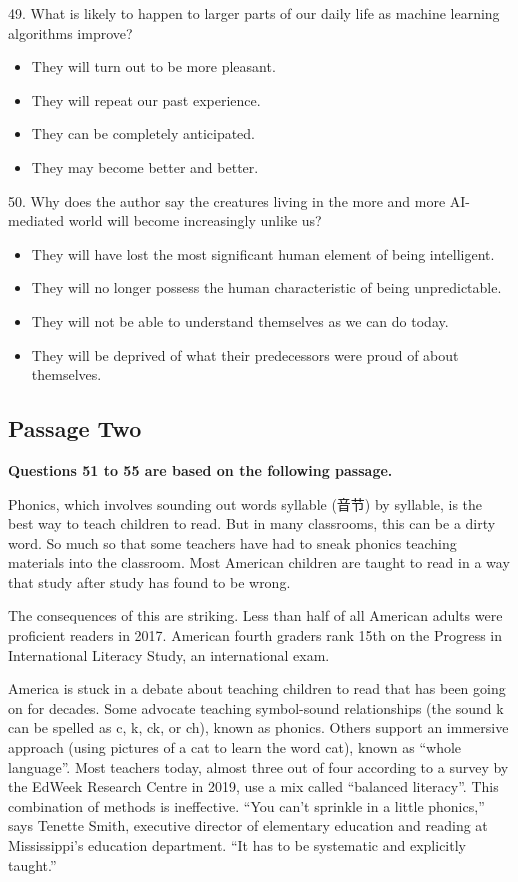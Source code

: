 \documentclass[UTF8,11pt]{ctexart}
\begin{document}
49. What is likely to happen to larger parts of our daily life as machine learning algorithms improve?


\begin{itemize}[leftmargin=2em,itemsep=.2em,topsep=.4em]\item[A.] They will turn out to be more pleasant.
\item[B.] They will repeat our past experience.
\item[C.] They can be completely anticipated.
\item[D.] They may become better and better.
\end{itemize}

50. Why does the author say the creatures living in the more and more AI-mediated world will become increasingly unlike us?


\begin{itemize}[leftmargin=2em,itemsep=.2em,topsep=.4em]\item[A.] They will have lost the most significant human element of being intelligent.
\item[B.] They will no longer possess the human characteristic of being unpredictable.
\item[C.] They will not be able to understand themselves as we can do today.
\item[D.] They will be deprived of what their predecessors were proud of about themselves.
\end{itemize}

\subsection*{\textbf{Passage Two}}


\textbf{Questions 51 to 55 are based on the following passage.}


Phonics, which involves sounding out words syllable (音节) by syllable, is the best way to teach children to read. But in many classrooms, this can be a dirty word. So much so that some teachers have had to sneak phonics teaching materials into the classroom. Most American children are taught to read in a way that study after study has found to be wrong.


The consequences of this are striking. Less than half of all American adults were proficient readers in 2017. American fourth graders rank 15th on the Progress in International Literacy Study, an international exam.


America is stuck in a debate about teaching children to read that has been going on for decades. Some advocate teaching symbol-sound relationships (the sound k can be spelled as c, k, ck, or ch), known as phonics. Others support an immersive approach (using pictures of a cat to learn the word cat), known as “whole language”. Most teachers today, almost three out of four according to a survey by the EdWeek Research Centre in 2019, use a mix called “balanced literacy”. This combination of methods is ineffective. “You can’t sprinkle in a little phonics,” says Tenette Smith, executive director of elementary education and reading at Mississippi’s education department. “It has to be systematic and explicitly taught.”
\end{document}
